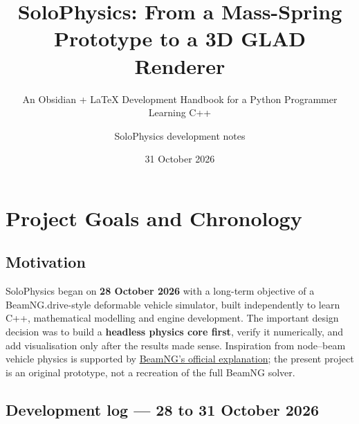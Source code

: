 \documentclass[
  10pt,
  a4paper,
]{article}
\title{SoloPhysics: From a Mass-Spring Prototype to a 3D GLAD Renderer}
\subtitle{An Obsidian + LaTeX Development Handbook for a Python
Programmer Learning C++}
\author{SoloPhysics development notes}
\date{31 October 2026}
\begin{document}
\maketitle

{
\setcounter{tocdepth}{2}
\tableofcontents
}
\section{Project Goals and
Chronology}\label{project-goals-and-chronology}

\subsection{Motivation}\label{motivation}

SoloPhysics began on \textbf{28 October 2026} with a long-term objective
of a BeamNG.drive-style deformable vehicle simulator, built
independently to learn C++, mathematical modelling and engine
development. The important design decision was to build a
\textbf{headless physics core first}, verify it numerically, and add
visualisation only after the results made sense. Inspiration from
node--beam vehicle physics is supported by
\href{https://www.beamng.com/game/about/physics/}{BeamNG's official
explanation}; the present project is an original prototype, not a
recreation of the full BeamNG solver.

\subsection{Development log --- 28 to 31 October
2026}\label{development-log-28-to-31-october-2026}
\end{document}
